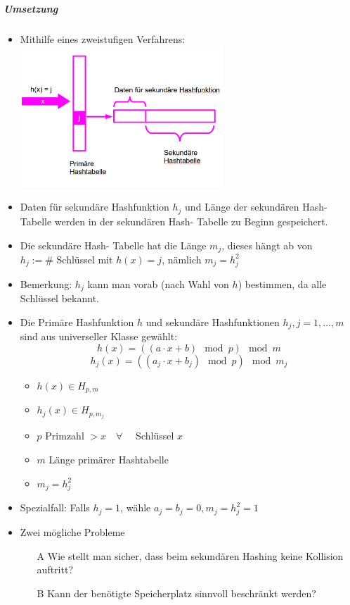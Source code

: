 \documentclass[fleqn]{scrartcl}
\begin{document}
\subparagraph{Umsetzung}

\begin{itemize}
\item Mithilfe eines zweistufigen Verfahrens:\\
\includegraphics[width=0.6\textwidth]{PerfektesHashing.png}
\item Daten für sekundäre Hashfunktion $h_j$ und Länge der sekundären Hash- Tabelle werden in der sekundären Hash- Tabelle zu Beginn gespeichert.
\item Die sekundäre Hash- Tabelle hat die Länge $m_j$, dieses hängt ab von\\ $h_j := \#$ Schlüssel mit $h(x) = j$, nämlich $m_j = h_j^2$
\item Bemerkung: $h_j$ kann man vorab (nach Wahl von $h$) bestimmen, da alle Schlüssel bekannt.
\item Die Primäre Hashfunktion $h$ und sekundäre Hashfunktionen $h_j, j = 1, ..., m$ sind aus universeller Klasse gewählt:
\[h(x) = ((a\cdot x + b) \mod{p} )\mod{m}\]
\[h_j(x) = ((a_j \cdot x + b_j) \mod{p}) \mod{m_j}\]
\begin{itemize}
\item $h(x) \in H_{p, m}$
\item $h_j(x) \in H_{p, m_j}$
\item $p$ Primzahl $> x \quad \forall \quad $ Schlüssel $x$
\item $m$ Länge primärer Hashtabelle
\item $m_j = h_j^2$
\end{itemize}
\item Spezialfall: Falls $h_j = 1$, wähle $a_j = b_j = 0, m_j = h_j^2 = 1$
\item Zwei mögliche Probleme
\begin{itemize}
\item[A] Wie stellt man sicher, dass beim sekundären Hashing keine Kollision auftritt?
\item[B] Kann der benötigte Speicherplatz sinnvoll beschränkt werden?
\end{itemize} 
\end{itemize}
\end{document}

